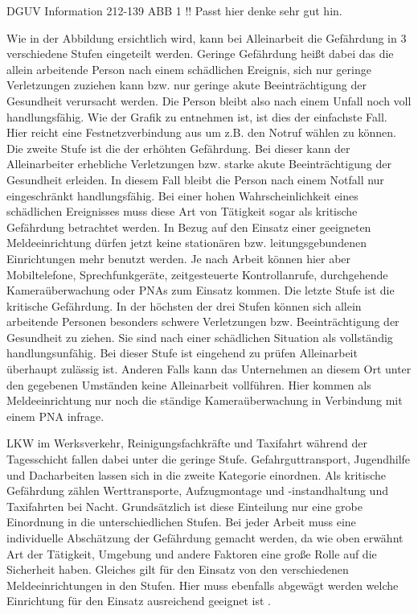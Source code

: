 \documentclass[thesis.tex]{subfiles}
\begin{document}
DGUV Information 212-139 ABB 1 !! Passt hier denke sehr gut hin.

Wie in der Abbildung ersichtlich wird, kann bei Alleinarbeit die Gefährdung in 3 verschiedene Stufen eingeteilt werden.
Geringe Gefährdung heißt dabei das die allein arbeitende Person nach einem schädlichen Ereignis, sich nur geringe Verletzungen zuziehen kann bzw. nur geringe akute Beeinträchtigung der Gesundheit verursacht werden.
Die Person bleibt also nach einem Unfall noch voll handlungsfähig.
Wie der Grafik zu entnehmen ist, ist dies der einfachste Fall.
Hier reicht eine Festnetzverbindung aus um z.B. den Notruf wählen zu können.
Die zweite Stufe ist die der erhöhten Gefährdung.
Bei dieser kann der Alleinarbeiter erhebliche Verletzungen bzw. starke akute Beeinträchtigung der Gesundheit erleiden.
In diesem Fall bleibt die Person nach einem Notfall nur eingeschränkt handlungsfähig.
Bei einer hohen Wahrscheinlichkeit eines schädlichen Ereignisses muss diese Art von Tätigkeit sogar als kritische Gefährdung betrachtet werden.
In Bezug auf den Einsatz einer geeigneten Meldeeinrichtung dürfen jetzt keine stationären bzw. leitungsgebundenen Einrichtungen mehr benutzt werden.
Je nach Arbeit können hier aber Mobiltelefone, Sprechfunkgeräte, zeitgesteuerte Kontrollanrufe, durchgehende Kameraüberwachung oder PNAs zum Einsatz kommen.
Die letzte Stufe ist die kritische Gefährdung.
In der höchsten der drei Stufen können sich allein arbeitende Personen besonders schwere Verletzungen bzw. Beeinträchtigung der Gesundheit zu ziehen.
Sie sind nach einer schädlichen Situation als vollständig handlungsunfähig.
Bei dieser Stufe ist eingehend zu prüfen Alleinarbeit überhaupt zulässig ist.
Anderen Falls kann das Unternehmen an diesem Ort unter den gegebenen Umständen keine Alleinarbeit vollführen.
Hier kommen als Meldeeinrichtung nur noch die ständige Kameraüberwachung in Verbindung mit einem PNA infrage.

LKW im Werksverkehr, Reinigungsfachkräfte und Taxifahrt während der Tagesschicht fallen dabei unter die geringe Stufe.
Gefahrguttransport, Jugendhilfe und Dacharbeiten lassen sich in die zweite Kategorie einordnen.
Als kritische Gefährdung zählen Werttransporte, Aufzugmontage und -instandhaltung und Taxifahrten bei Nacht.
Grundsätzlich ist diese Einteilung nur eine grobe Einordnung in die unterschiedlichen Stufen.
Bei jeder Arbeit muss eine individuelle Abschätzung der Gefährdung gemacht werden, da wie oben erwähnt Art der Tätigkeit, Umgebung und andere Faktoren eine große Rolle auf die Sicherheit haben.
Gleiches gilt für den Einsatz von den verschiedenen Meldeeinrichtungen in den Stufen.
Hier muss ebenfalls abgewägt werden welche Einrichtung für den Einsatz ausreichend geeignet ist \cite[vgl. S.7-9]{Information_212-139}.
\end{document}
